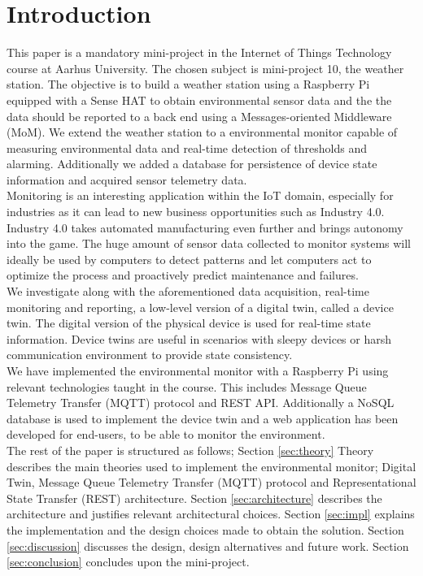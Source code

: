 \section{Introduction}
This paper is a mandatory mini-project in the Internet of Things Technology course at Aarhus University. The chosen subject is mini-project 10, the weather station. The objective is to build a weather station using a Raspberry Pi equipped with a Sense HAT to obtain environmental sensor data and the the data should be reported to a back end using a Messages-oriented Middleware (MoM). We extend the weather station to a environmental monitor capable of measuring environmental data and real-time detection of thresholds and alarming. Additionally we added a database for persistence of device state information and acquired sensor telemetry data. \\

Monitoring is an interesting application within the IoT domain, especially for industries as it can lead to new business opportunities such as Industry 4.0. Industry 4.0 takes automated manufacturing even further and brings autonomy into the game. The huge amount of sensor data collected to monitor systems will ideally be used by computers to detect patterns and let computers act to optimize the process and proactively predict maintenance and failures. \\

We investigate along with the aforementioned data acquisition, real-time monitoring and reporting, a low-level version of a digital twin, called a device twin. The digital version of the physical device is used for real-time state information. Device twins are useful in scenarios with sleepy devices or harsh communication environment to provide state consistency. \\

We have implemented the environmental monitor with a Raspberry Pi using relevant technologies taught in the course. This includes Message Queue Telemetry Transfer (MQTT) protocol and REST API. Additionally a NoSQL database is used to implement the device twin and a web application has been developed for end-users, to be able to monitor the environment. \\

The rest of the paper is structured as follows; Section \ref{sec:theory} Theory describes the main theories used to implement the environmental monitor; Digital Twin, Message Queue Telemetry Transfer (MQTT) protocol and Representational State Transfer (REST) architecture. Section \ref{sec:architecture} describes the architecture and justifies relevant architectural choices. Section \ref{sec:impl} explains the implementation and the design choices made to obtain the solution. Section \ref{sec:discussion} discusses the design, design alternatives and future work. Section \ref{sec:conclusion} concludes upon the mini-project.

